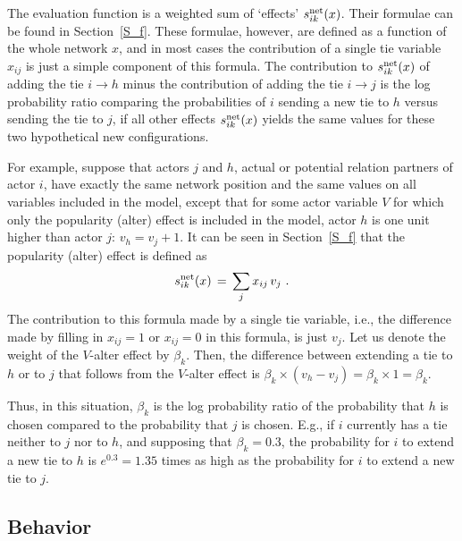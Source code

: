 \documentclass[a4paper,fleqn,11pt]{article}
\newcommand{\+}{\, + \,}
\begin{document}
The evaluation function is a weighted sum of `effects'
$s^{\rm net}_{ik}(x)$.
Their formulae can be found in Section~\ref{S_f}.
These formulae, however, are defined as a function of the whole
network $x$, and in most cases the contribution of a single tie
variable $x_{ij}$ is just a simple component of this formula.
The contribution to $s^{\rm net}_{ik}(x)$
of adding the tie $i \rightarrow h$ minus the
contribution of adding the tie $i \rightarrow j$ is the log probability ratio
comparing the probabilities of $i$ sending a new tie to $h$ versus
sending the tie to $j$, if all other effects $s^{\rm net}_{ik}(x)$
yields the same values for these two hypothetical new configurations.

For example, suppose that actors $j$ and $h$,
actual or potential relation partners of actor $i$,
have exactly the same network
position and the same values on all variables included in the model,
except that for some actor variable $V$ for which only the
popularity (alter) effect is included in the model,
actor $h$ is one unit higher than actor $j$: $v_h = v_j + 1$.
It can be seen in Section~\ref{S_f} that
the popularity (alter) effect is defined as
\[
s^{\rm net}_{ik}(x) \, = \,  \sum_j x_{ij}\, v_j \ .
\]
The contribution to this formula made by a single tie variable,
i.e., the difference made by filling in $x_{ij} = 1$ or $x_{ij} = 0$
in this formula, is just $v_j$.
Let us denote the weight of the $V$-alter effect by $\beta_k$.
Then, the difference between extending a tie to $h$ or to $j$
that follows from the $V$-alter effect is
$\beta_k \times (v_h - v_j) = \beta_k \times 1 = \beta_k$.

Thus, in this situation, $\beta_k$ is the log probability ratio of the probability
that $h$ is chosen compared to the probability that $j$ is chosen.
E.g., if $i$ currently has a tie neither to $j$ nor to $h$,
and supposing that $\beta_k = 0.3$, the probability for $i$ to
extend a new tie to $h$ is $e^{0.3} = 1.35$ times as high
as the probability for $i$ to extend a new tie to $j$.

\subsection{Behavior}
\end{document}
